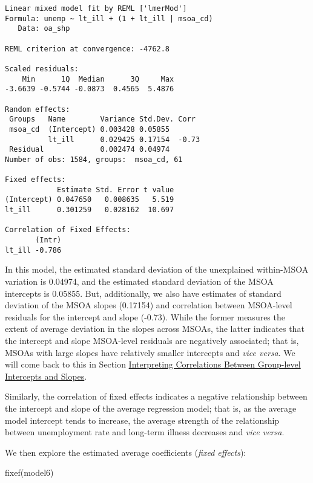 \documentclass[
  letterpaper,
  krantz2]{style/krantz}
\newenvironment{Shaded}{\begin{snugshade}}{\end{snugshade}}
\newcommand{\FunctionTok}[1]{\textcolor[rgb]{0.28,0.35,0.67}{#1}}
\newcommand{\NormalTok}[1]{\textcolor[rgb]{0.00,0.23,0.31}{#1}}
\begin{document}
\begin{verbatim}
Linear mixed model fit by REML ['lmerMod']
Formula: unemp ~ lt_ill + (1 + lt_ill | msoa_cd)
   Data: oa_shp

REML criterion at convergence: -4762.8

Scaled residuals: 
    Min      1Q  Median      3Q     Max 
-3.6639 -0.5744 -0.0873  0.4565  5.4876 

Random effects:
 Groups   Name        Variance Std.Dev. Corr 
 msoa_cd  (Intercept) 0.003428 0.05855       
          lt_ill      0.029425 0.17154  -0.73
 Residual             0.002474 0.04974       
Number of obs: 1584, groups:  msoa_cd, 61

Fixed effects:
            Estimate Std. Error t value
(Intercept) 0.047650   0.008635   5.519
lt_ill      0.301259   0.028162  10.697

Correlation of Fixed Effects:
       (Intr)
lt_ill -0.786
\end{verbatim}

In this model, the estimated standard deviation of the unexplained
within-MSOA variation is 0.04974, and the estimated standard deviation
of the MSOA intercepts is 0.05855. But, additionally, we also have
estimates of standard deviation of the MSOA slopes (0.17154) and
correlation between MSOA-level residuals for the intercept and slope
(-0.73). While the former measures the extent of average deviation in
the slopes across MSOAs, the latter indicates that the intercept and
slope MSOA-level residuals are negatively associated; that is, MSOAs
with large slopes have relatively smaller intercepts and \emph{vice
versa}. We will come back to this in Section
\protect\hyperlink{interpreting-correlations-between-group-level-intercepts-and-slopes}{Interpreting
Correlations Between Group-level Intercepts and Slopes}.

Similarly, the correlation of fixed effects indicates a negative
relationship between the intercept and slope of the average regression
model; that is, as the average model intercept tends to increase, the
average strength of the relationship between unemployment rate and
long-term illness decreases and \emph{vice versa}.

We then explore the estimated average coefficients (\emph{fixed
effects}):

\begin{Shaded}
\begin{Highlighting}[]
\FunctionTok{fixef}\NormalTok{(model6)}
\end{Highlighting}
\end{Shaded}
\end{document}
